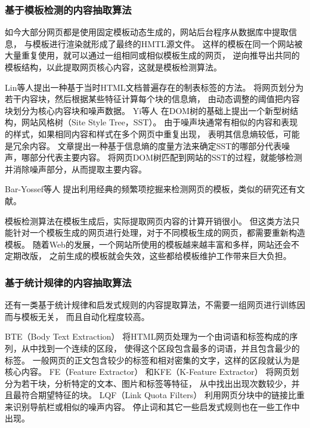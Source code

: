 \subsubsection{基于模板检测的内容抽取算法}

如今大部分网页都是使用固定模板动态生成的，网站后台程序从数据库中提取信息，
与模板进行渲染就形成了最终的HMTL源文件。
这样的模板在同一个网站被大量重复使用，就可以通过一组相同或相似模板生成的网页，
逆向推导出共同的模板结构，以此提取网页核心内容，这就是模板检测算法。

Lin等人提出一种基于当时HTML文档普遍存在的制表标签的方法。
将网页划分为若干内容块，然后根据某些特征计算每个块的信息熵，
由动态调整的阈值把内容块划分为核心内容块和噪声数据。
Yi等人
在DOM树的基础上提出一个新型树结构，网站风格树（Site Style Tree，SST）。
由于噪声块通常有相似的内容和表现的样式，如果相同内容和样式在多个网页中重复出现，
表明其信息熵较低，可能是冗余内容。
文章提出一种基于信息熵的度量方法来确定SST的哪部分代表噪声，哪部分代表主要内容。
将网页DOM树匹配到网站的SST的过程，就能够检测并消除噪声部分，从而提取主要内容。

Bar-Yossef等人
提出利用经典的频繁项挖掘来检测网页的模板，类似的研究还有文献\cite{chen2006template}。

模板检测算法在模板生成后，实际提取网页内容的计算开销很小。
但这类方法只能针对一个模板生成的网页进行处理，对于不同模板生成的网页，都需要重新构造模板。
随着Web的发展，一个网站所使用的模板越来越丰富和多样，网站还会不定期改版，
之前生成的模板就会失效，这些都给模板维护工作带来巨大负担。

\subsubsection{基于统计规律的内容抽取算法}

还有一类基于统计规律和启发式规则的内容提取算法，不需要一组网页进行训练因而与模板无关，
而且自动化程度较高。

BTE（Body Text Extraction）
将HTML网页处理为一个由词语和标签构成的序列，从中找到一个连续的区段，
使得这个区段包含最多的词语，并且包含最少的标签。
一般网页的正文包含较少的标签和相对密集的文字，这样的区段就认为是核心内容。
FE（Feature Extractor）
和KFE（K-Feature Extractor）
将网页划分为若干块，分析特定的文本、图片和标签等特征，
从中找出出现次数较少，并且最符合期望特征的块。
LQF（Link Quota Filters）
利用网页分块中的链接比重来识别导航栏或相似的噪声内容。
停止词和其它一些启发式规则也在一些工作中出现。

